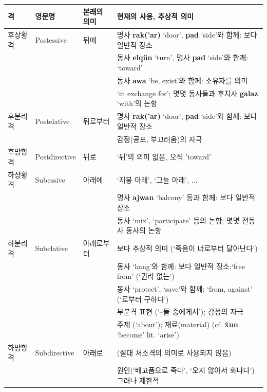 \begin{table}[H]
\begin{center}
\begin{tabular}{llll}
\hline
격		&영문명		&본래의 의미	&현재의 사용, 추상적 의미\\

\hline
후상황격	&Postessive	&뒤에	&명사 \textbf{rak('ar)} `door', \textbf{pad} `side'와 함께: 보다 일반적 장소\\
&&&동사 \textbf{elqün} `turn', 명사 \textbf{pad} `side'와 함께: `toward'\\
&&&동사 \textbf{awa} `be, exist'와 함께: 소유자를 의미\\
&&&`in exchange for'; 몇몇 동사들과 후치사 \textbf{galaz} `with'의 논항\\
후분리격	&Postelative	&뒤로부터&명사 \textbf{rak('ar)} `door', \textbf{pad} `side'와 함께: 보다 일반적 장소\\
&&&감정(공포, 부끄러움)의 자극\\
후방향격	&Postdirective	&뒤로&`뒤'의 의미 없음, 오직 'toward'\\

\hline
하상황격	&Subessive	&아래에	&`지붕 아래', `그늘 아래', ...\\
&&&명사 \textbf{ajwan} `balcony' 등과 함께: 보다 일반적 장소\\
&&&동사 `mix', `participate' 등의 논항; 몇몇 전동사 동사의 논항\\
하분리격	&Subelative	&아래로부터&보다 추상적 의미 (`죽음이 너로부터 달아난다')\\
&&&동사 `hang'와 함께: 보다 일반적 장소;`free from' (`권리 없는')\\
&&&동사 `protect', `save'와 함께: `from, against' (`로부터 구하다')\\
&&&부분격 표현 (`--들 중에게서'); 감정의 자극\\
&&&주제 (`about'); 재료(material) (cf. \textbf{\^xun} `become' lit. `arise')\\
하방향격	&Subdirective	&아래로&(절대 처소격의 의미로 사용되지 않음)\\
&&&원인(`배고픔으로 죽다', `오지 않아서 화나다') 그러나 제한적\\


\end{tabular}
\end{center}
\end{table}
